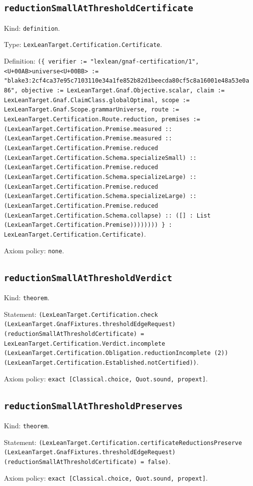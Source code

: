 \documentclass[11pt]{article}
\begin{document}
\subsection*{\texttt{reductionSmallAtThresholdCertificate}}
\noindent Kind: \texttt{definition}.\par
\noindent Type: \texttt{LexLeanTarget.Certification.Certificate}.\par
\noindent Definition: \texttt{(\{ verifier := "lexlean/gnaf-certification/1", <U+00AB>universe<U+00BB> := "blake3:2cf4ca37e95c7103110e34a1fe852b82d1beecda80cf5c8a16001e48a53e0a86", objective := LexLeanTarget.Gnaf.Objective.scalar, claim := LexLeanTarget.Gnaf.ClaimClass.globalOptimal, scope := LexLeanTarget.Gnaf.Scope.grammarUniverse, route := LexLeanTarget.Certification.Route.reduction, premises := (LexLeanTarget.Certification.Premise.measured :: (LexLeanTarget.Certification.Premise.measured :: (LexLeanTarget.Certification.Premise.reduced (LexLeanTarget.Certification.Schema.specializeSmall) :: (LexLeanTarget.Certification.Premise.reduced (LexLeanTarget.Certification.Schema.specializeLarge) :: (LexLeanTarget.Certification.Premise.reduced (LexLeanTarget.Certification.Schema.specializeLarge) :: (LexLeanTarget.Certification.Premise.reduced (LexLeanTarget.Certification.Schema.collapse) :: ([] : List (LexLeanTarget.Certification.Premise)))))))) \} : LexLeanTarget.Certification.Certificate)}.\par
\noindent Axiom policy: \texttt{none}.\par
\subsection*{\texttt{reductionSmallAtThresholdVerdict}}
\noindent Kind: \texttt{theorem}.\par
\noindent Statement: \texttt{(LexLeanTarget.Certification.check (LexLeanTarget.GnafFixtures.thresholdEdgeRequest) (reductionSmallAtThresholdCertificate) = LexLeanTarget.Certification.Verdict.incomplete (LexLeanTarget.Certification.Obligation.reductionIncomplete (2)) (LexLeanTarget.Certification.Established.notCertified))}.\par
\noindent Axiom policy: \texttt{exact [Classical.choice, Quot.sound, propext]}.\par
\subsection*{\texttt{reductionSmallAtThresholdPreserves}}
\noindent Kind: \texttt{theorem}.\par
\noindent Statement: \texttt{(LexLeanTarget.Certification.certificateReductionsPreserve (LexLeanTarget.GnafFixtures.thresholdEdgeRequest) (reductionSmallAtThresholdCertificate) = false)}.\par
\noindent Axiom policy: \texttt{exact [Classical.choice, Quot.sound, propext]}.\par
\end{document}
